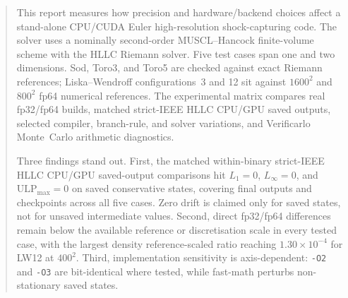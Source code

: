 \begin{abstract}
This report measures how precision and hardware/backend choices affect a
stand-alone CPU/CUDA Euler high-resolution shock-capturing code. The
solver uses a nominally second-order MUSCL--Hancock finite-volume scheme
with the HLLC Riemann solver. Five test cases span one and two dimensions. Sod, Toro3, and Toro5 are
checked against exact Riemann references; Liska--Wendroff configurations~3
and 12 sit against \(1600^2\) and \(800^2\) fp64 numerical references. The experimental matrix compares real
fp32/fp64 builds, matched strict-IEEE HLLC CPU/GPU saved outputs,
selected compiler, branch-rule, and solver variations, and Verificarlo
Monte~Carlo arithmetic diagnostics.

Three findings stand out. First, the matched within-binary strict-IEEE HLLC
CPU/GPU saved-output comparisons hit \(L_1=0\), \(L_\infty=0\), and
\(\mathrm{ULP}_{\max}=0\) on saved conservative states, covering final
outputs and checkpoints across all five cases. Zero drift is claimed only for
saved states, not for unsaved intermediate values. Second, direct
fp32/fp64 differences remain below the available reference or
discretisation scale in every tested case, with the largest density
reference-scaled ratio reaching \(1.30\times10^{-4}\) for LW12 at
\(400^2\). Third, implementation sensitivity is axis-dependent: \texttt{-O2}
and \texttt{-O3} are bit-identical where tested, while fast-math perturbs
non-stationary saved states.
\end{abstract}
